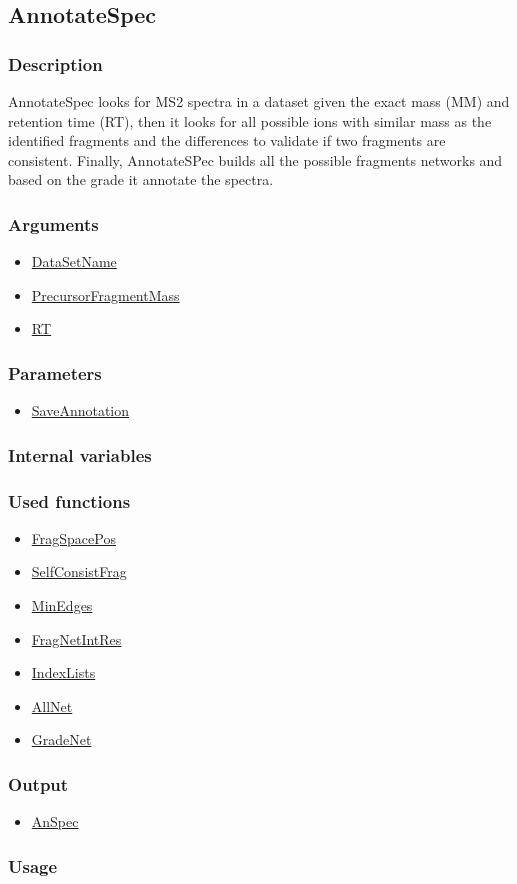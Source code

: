 \subsection{AnnotateSpec}\label{AnnotateSpec}
\subsubsection{Description}
AnnotateSpec looks for MS2 spectra in a dataset given the exact mass (MM) and retention time (RT), then it looks for all possible ions with similar mass as the identified fragments and the differences to validate if two fragments are consistent. Finally, AnnotateSPec builds all the possible fragments networks and based on the grade it annotate the spectra.
\subsubsection{Arguments}
\begin{itemize}
\item \hyperref[DataSetName]{DataSetName}
\item \hyperref[PrecursorFragmentMass]{PrecursorFragmentMass}
\item \hyperref[RT]{RT}
\end{itemize}
\subsubsection{Parameters}
\begin{itemize}
\item \hyperref[SaveAnnotation]{SaveAnnotation}
\end{itemize}
\subsubsection{Internal variables}
\subsubsection{Used functions}
\begin{itemize}
\item \hyperref[FragSpacePos]{FragSpacePos}
\item \hyperref[SelfConsistFrag]{SelfConsistFrag}
\item \hyperref[MinEdges]{MinEdges}
\item \hyperref[FragNetIntRes]{FragNetIntRes}
\item \hyperref[IndexLists]{IndexLists}
\item \hyperref[AllNet]{AllNet}
\item \hyperref[GradeNet]{GradeNet}
\end{itemize}
\subsubsection{Output}
\begin{itemize}
\item \hyperref[AnSpec]{AnSpec}
\end{itemize}
\subsubsection{Usage}
